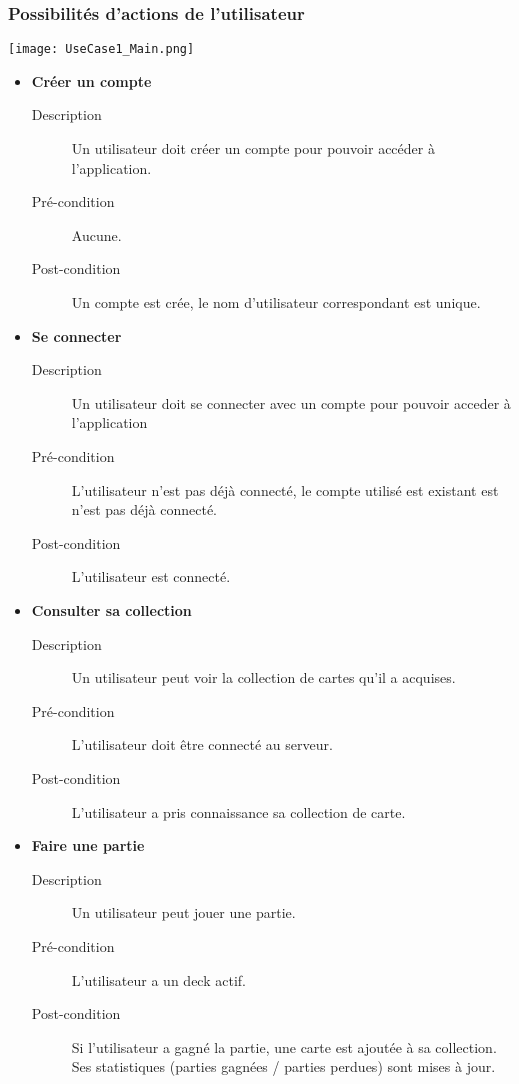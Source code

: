 \documentclass{article}
\begin{document}
		\subsubsection{Possibilités d'actions de l'utilisateur}
			\begin{center}\texttt{[image: UseCase1\_Main.png]}\end{center}
			\begin{itemize}
				\item \textbf{Créer un compte}
				\begin{description}
					\item[Description] Un utilisateur doit créer un compte pour pouvoir accéder à l'application.
					\item[Pré-condition] Aucune.
					\item[Post-condition] Un compte est crée, le nom d'utilisateur correspondant est unique.\\
				\end{description}

				\item \textbf{Se connecter}
				\begin{description}
					\item[Description] Un utilisateur doit se connecter avec un compte pour pouvoir acceder à l'application
					\item[Pré-condition] L'utilisateur n'est pas déjà connecté, le compte utilisé est existant est n'est pas déjà connecté.
					\item[Post-condition] L'utilisateur est connecté.\\
				\end{description}

				\item \textbf{Consulter sa collection}
				\begin{description}
					\item[Description] Un utilisateur peut voir la collection de cartes qu'il a acquises.
					\item[Pré-condition] L'utilisateur doit être connecté au serveur.
					\item[Post-condition] L'utilisateur a pris connaissance sa collection de carte.\\
				\end{description}

				\item \textbf{Faire une partie}
				\begin{description}
					\item[Description] Un utilisateur peut jouer une partie.
					\item[Pré-condition] L'utilisateur a un deck actif.
					\item[Post-condition] Si l'utilisateur a gagné la partie, une carte est ajoutée à sa collection.
					Ses statistiques (parties gagnées / parties perdues) sont mises à jour.\\
				\end{description}


\end{itemize}
\end{document}
